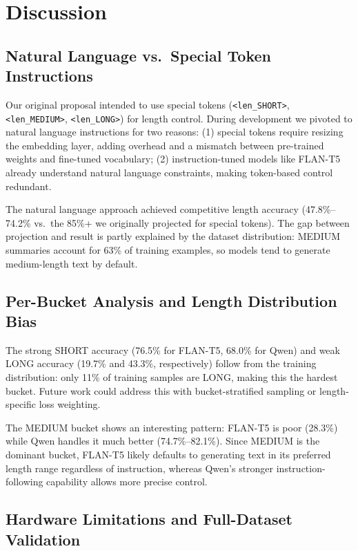 \documentclass[11pt,a4paper]{article}
\begin{document}
\section{Discussion}

\subsection{Natural Language vs.\ Special Token Instructions}

Our original proposal intended to use special tokens (\texttt{<len\_SHORT>}, \texttt{<len\_MEDIUM>}, \texttt{<len\_LONG>}) for length control.
During development we pivoted to natural language instructions for two reasons: (1) special tokens require resizing the embedding layer, adding overhead and a mismatch between pre-trained weights and fine-tuned vocabulary; (2) instruction-tuned models like FLAN-T5 already understand natural language constraints, making token-based control redundant.

The natural language approach achieved competitive length accuracy (47.8\%--74.2\% vs.\ the 85\%+ we originally projected for special tokens).
The gap between projection and result is partly explained by the dataset distribution: MEDIUM summaries account for 63\% of training examples, so models tend to generate medium-length text by default.

\subsection{Per-Bucket Analysis and Length Distribution Bias}

The strong SHORT accuracy (76.5\% for FLAN-T5, 68.0\% for Qwen) and weak LONG accuracy (19.7\% and 43.3\%, respectively) follow from the training distribution: only 11\% of training samples are LONG, making this the hardest bucket.
Future work could address this with bucket-stratified sampling or length-specific loss weighting.

The MEDIUM bucket shows an interesting pattern: FLAN-T5 is poor (28.3\%) while Qwen handles it much better (74.7\%--82.1\%).
Since MEDIUM is the dominant bucket, FLAN-T5 likely defaults to generating text in its preferred length range regardless of instruction, whereas Qwen's stronger instruction-following capability allows more precise control.

\subsection{Hardware Limitations and Full-Dataset Validation}
\end{document}
